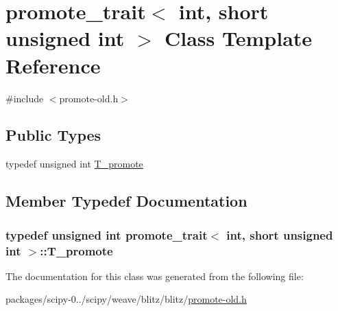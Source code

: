 \hypertarget{classpromote__trait_3_01int_00_01short_01unsigned_01int_01_4}{}\section{promote\+\_\+trait$<$ int, short unsigned int $>$ Class Template Reference}
\label{classpromote__trait_3_01int_00_01short_01unsigned_01int_01_4}


{\ttfamily \#include $<$promote-\/old.\+h$>$}

\subsection*{Public Types}
\begin{DoxyCompactItemize}
\item 
typedef unsigned int \hyperlink{classpromote__trait_3_01int_00_01short_01unsigned_01int_01_4_acc27443d7897bf6613ec2ae647ead620}{T\+\_\+promote}
\end{DoxyCompactItemize}


\subsection{Member Typedef Documentation}
\hypertarget{classpromote__trait_3_01int_00_01short_01unsigned_01int_01_4_acc27443d7897bf6613ec2ae647ead620}{}
\subsubsection[{T\+\_\+promote}]{\setlength{\rightskip}{0pt plus 5cm}typedef unsigned int {\bf promote\+\_\+trait}$<$ int, short unsigned int $>$\+::{\bf T\+\_\+promote}}\label{classpromote__trait_3_01int_00_01short_01unsigned_01int_01_4_acc27443d7897bf6613ec2ae647ead620}


The documentation for this class was generated from the following file\+:\begin{DoxyCompactItemize}
\item 
packages/scipy-\/0../scipy/weave/blitz/blitz/\hyperlink{promote-old_8h}{promote-\/old.\+h}\end{DoxyCompactItemize}

